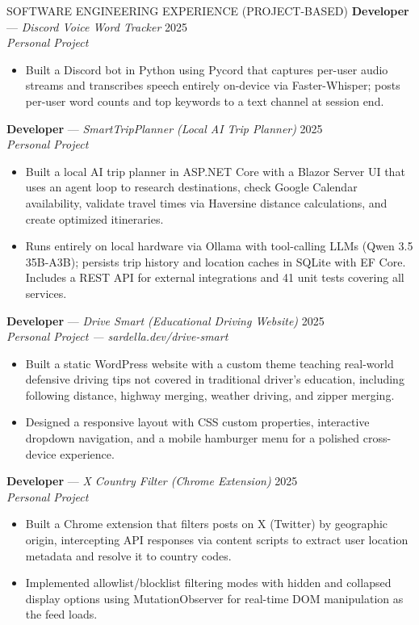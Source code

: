 \documentclass{resume}
\begin{document}
\begin{rSection}{SOFTWARE ENGINEERING EXPERIENCE (PROJECT-BASED)}
\textbf{Developer} --- \textit{Discord Voice Word Tracker} \hfill 2025 \\
\textit{Personal Project}
\begin{itemize}
    \item Built a Discord bot in Python using Pycord that captures per-user audio streams and transcribes speech entirely on-device via Faster-Whisper; posts per-user word counts and top keywords to a text channel at session end.
\end{itemize}

\textbf{Developer} --- \textit{SmartTripPlanner (Local AI Trip Planner)} \hfill 2025 \\
\textit{Personal Project}
\begin{itemize}
    \item Built a local AI trip planner in ASP.NET Core with a Blazor Server UI that uses an agent loop to research destinations, check Google Calendar availability, validate travel times via Haversine distance calculations, and create optimized itineraries.
    \item Runs entirely on local hardware via Ollama with tool-calling LLMs (Qwen 3.5 35B-A3B); persists trip history and location caches in SQLite with EF Core. Includes a REST API for external integrations and 41 unit tests covering all services.
\end{itemize}

\textbf{Developer} --- \textit{Drive Smart (Educational Driving Website)} \hfill 2025 \\
\textit{Personal Project --- sardella.dev/drive-smart}
\begin{itemize}
    \item Built a static WordPress website with a custom theme teaching real-world defensive driving tips not covered in traditional driver's education, including following distance, highway merging, weather driving, and zipper merging.
    \item Designed a responsive layout with CSS custom properties, interactive dropdown navigation, and a mobile hamburger menu for a polished cross-device experience.
\end{itemize}

\textbf{Developer} --- \textit{X Country Filter (Chrome Extension)} \hfill 2025 \\
\textit{Personal Project}
\begin{itemize}
    \item Built a Chrome extension that filters posts on X (Twitter) by geographic origin, intercepting API responses via content scripts to extract user location metadata and resolve it to country codes.
    \item Implemented allowlist/blocklist filtering modes with hidden and collapsed display options using MutationObserver for real-time DOM manipulation as the feed loads.
\end{itemize}

\end{rSection}
\end{document}
